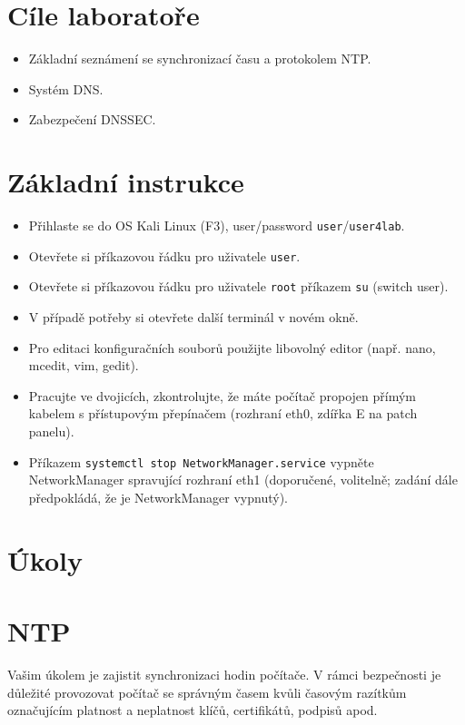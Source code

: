
\section*{Cíle laboratoře}
\begin{itemize}
  \item Základní seznámení se synchronizací času a protokolem NTP.
  \item Systém DNS.
  \item Zabezpečení DNSSEC.
\end{itemize}

\section*{Základní instrukce}
\begin{itemize}
  \item Přihlaste se do OS Kali Linux (F3), user/password {\tt user}/{\tt user4lab}.
  \item Otevřete si příkazovou řádku pro uživatele {\tt user}.
  \item Otevřete si příkazovou řádku pro uživatele {\tt root} příkazem {\tt su}
  (switch user).
  \item V případě potřeby si otevřete další terminál v novém okně.
  \item Pro editaci konfiguračních souborů použijte libovolný editor (např.
  nano, mcedit, vim, gedit).
  \item Pracujte ve dvojicích, zkontrolujte, že máte počítač propojen
    přímým kabelem s přístupovým přepínačem (rozhraní eth0, zdířka E na patch
    panelu).
  \item Příkazem {\tt systemctl stop NetworkManager.service} vypněte
    NetworkManager spravující rozhraní eth1 (doporučené, volitelně; zadání dále
    předpokládá, že je NetworkManager vypnutý).

\end{itemize}

\section*{Úkoly}
\section{NTP}

Vašim úkolem je zajistit synchronizaci hodin počítače. V rámci bezpečnosti je
důležité provozovat počítač se správným časem kvůli časovým razítkům
označujícím platnost a neplatnost klíčů, certifikátů, podpisů apod.


